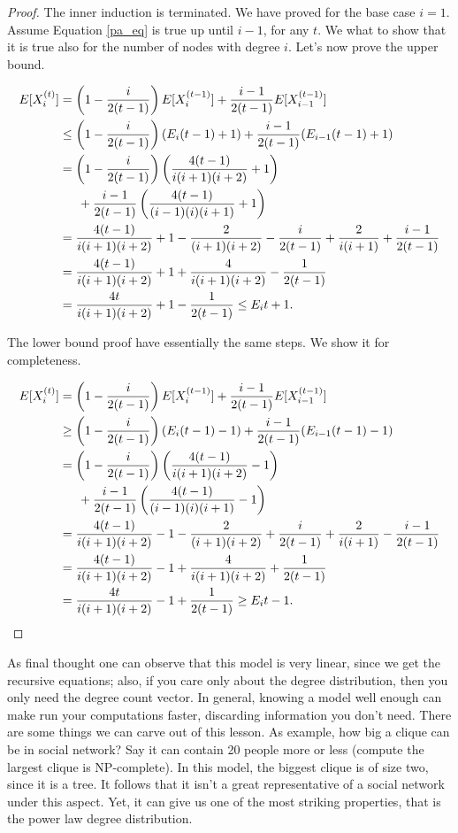 \begin{proof}
The inner induction is terminated. We have proved for the base case $i = 1$. Assume Equation \ref{pa_eq} is true up until $i-1$, for any $t$. We what to show that it is true also for the number of nodes with degree $i$. Let's now prove the upper bound.

\begin{align}
E[X_i^{(t)}] &= \left(1-\frac{i}{2(t-1)}\right)E[X_i^{(t-1)}] +\frac{i -1}{2(t-1)}E[X_{i-1}^{(t-1)}]\\
&\leq \left(1-\frac{i}{2(t-1)}\right)(E_i(t-1)+1) +\frac{i -1}{2(t-1)}(E_{i-1}(t-1)+1)\\
&=\left(1-\frac{i}{2(t-1)}\right)\left(\frac{4(t-1)}{i(i+1)(i+2)}+1\right)\\
&\indent+\frac{i -1}{2(t-1)}\left(\frac{4(t-1)}{(i-1)(i)(i+1)}+1\right)\\
&=\frac{4(t-1)}{i(i+1)(i+2)} + 1 -\frac{2}{(i+1)(i+2)} -\frac{i}{2(t-1)} + \frac{2}{i(i+1)} + \frac{i-1}{2(t-1)}\\
&=\frac{4(t-1)}{i(i+1)(i+2)} + 1 +\frac{4}{i(i+1)(i+2)} -\frac{1}{2(t-1)}\\
&=\frac{4t}{i(i+1)(i+2)} + 1 -\frac{1}{2(t-1)} \leq E_it+1.
\end{align}

The lower bound proof have essentially the same steps. We show it for completeness.

\begin{align}
E[X_i^{(t)}] &= \left(1-\frac{i}{2(t-1)}\right)E[X_i^{(t-1)}] +\frac{i -1}{2(t-1)}E[X_{i-1}^{(t-1)}]\\
&\geq \left(1-\frac{i}{2(t-1)}\right)(E_i(t-1)-1) +\frac{i -1}{2(t-1)}(E_{i-1}(t-1)-1)\\
&=\left(1-\frac{i}{2(t-1)}\right)\left(\frac{4(t-1)}{i(i+1)(i+2)}-1\right)\\
&\indent+\frac{i -1}{2(t-1)}\left(\frac{4(t-1)}{(i-1)(i)(i+1)}-1\right)\\
&=\frac{4(t-1)}{i(i+1)(i+2)} -1 -\frac{2}{(i+1)(i+2)} +\frac{i}{2(t-1)} + \frac{2}{i(i+1)} - \frac{i-1}{2(t-1)}\\
&=\frac{4(t-1)}{i(i+1)(i+2)} -1 +\frac{4}{i(i+1)(i+2)} +\frac{1}{2(t-1)}\\
&=\frac{4t}{i(i+1)(i+2)} -1 +\frac{1}{2(t-1)} \geq E_it-1.
\end{align}
\end{proof}

As final thought one can observe that this model is very linear, since we get the recursive equations; also, if you care only about the degree distribution, then you only need the degree count vector. In general, knowing a model well enough can make run your computations faster, discarding information you don't need. There are some things we can carve out of this lesson. As example, how big a clique can be in social network? Say it can contain 20 people more or less (compute the largest clique is NP-complete). In this model, the biggest clique is of size two, since it is a tree. It follows that it isn't a great representative of a social network under this aspect. Yet, it can give us one of the most striking properties, that is the power law degree distribution.